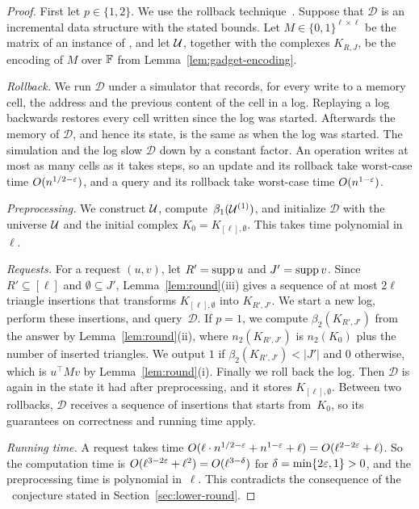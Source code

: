 \begin{proof}
First let $p\in\{1,2\}$.
We use the rollback technique~\cite{AV14,HKNS15}.
Suppose that $\mathcal{D}$ is an incremental data structure with the stated bounds.
Let $M\in\{0,1\}^{\ell\times\ell}$ be the matrix of an instance of \OuMv, and let $\mathcal{U}$, together with the complexes $K_{R,J}$, be the encoding of $M$ over $\mathbb{F}$ from Lemma~\ref{lem:gadget-encoding}.

\emph{Rollback.}
We run $\mathcal{D}$ under a simulator that records, for every write to a memory cell, the address and the previous content of the cell in a log.
Replaying a log backwards restores every cell written since the log was started.
Afterwards the memory of $\mathcal{D}$, and hence its state, is the same as when the log was started.
The simulation and the log slow $\mathcal{D}$ down by a constant factor.
An operation writes at most as many cells as it takes steps, so an update and its rollback take worst-case time $O(n^{1/2-\varepsilon})$, and a query and its rollback take worst-case time $O(n^{1-\varepsilon})$.

\emph{Preprocessing.}
We construct $\mathcal{U}$, compute~$\beta_1(\mathcal{U}^{(1)})$, and initialize $\mathcal{D}$ with the universe $\mathcal{U}$ and the initial complex $K_0=K_{[\ell],\emptyset}$.
This takes time polynomial in~$\ell$.

\emph{Requests.}
For a request $(u,v)$, let $R'=\operatorname{supp} u$ and $J'=\operatorname{supp} v$.
Since $R'\subseteq[\ell]$ and $\emptyset\subseteq J'$, Lemma~\ref{lem:round}(iii) gives a sequence of at most $2\ell$ triangle insertions that transforms $K_{[\ell],\emptyset}$ into $K_{R',J'}$.
We start a new log, perform these insertions, and query~$\mathcal{D}$.
If $p=1$, we compute $\beta_2(K_{R',J'})$ from the answer by Lemma~\ref{lem:round}(ii), where $n_2(K_{R',J'})$ is $n_2(K_0)$ plus the number of inserted triangles.
We output $1$ if $\beta_2(K_{R',J'})<|J'|$ and $0$ otherwise, which is $u^{\top}Mv$ by Lemma~\ref{lem:round}(i).
Finally we roll back the log.
Then $\mathcal{D}$ is again in the state it had after preprocessing, and it stores $K_{[\ell],\emptyset}$.
Between two rollbacks, $\mathcal{D}$ receives a sequence of insertions that starts from~$K_0$, so its guarantees on correctness and running time apply.

\emph{Running time.}
A request takes time $O(\ell\cdot n^{1/2-\varepsilon}+n^{1-\varepsilon}+\ell)=O(\ell^{2-2\varepsilon}+\ell)$.
So the computation time is $O(\ell^{3-2\varepsilon}+\ell^2)=O(\ell^{3-\delta})$ for $\delta=\min\{2\varepsilon,1\}>0$, and the preprocessing time is polynomial in~$\ell$.
This contradicts the consequence of the \OMv\ conjecture stated in Section~\ref{sec:lower-round}.


\end{proof}
